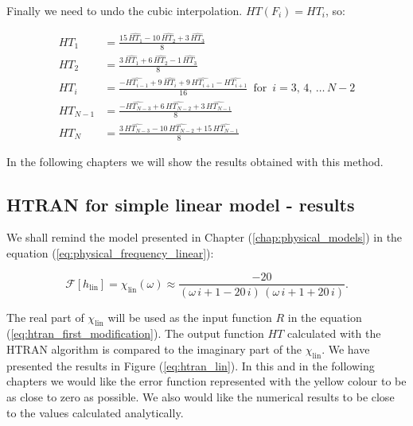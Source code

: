 \documentclass[12pt,twoside,a4paper]{article}
\numberwithin{equation}{subsection}
\numberwithin{figure}{subsection}
\begin{document}
Finally we need to undo the cubic interpolation. $ HT(F_i) = HT_{i} $, so: 

\begin{align}
  \label{eq:htundo_first}  
    HT_1       & = \frac {15 \, \widehat{HT_1} - 10 \, \widehat{HT_2} + 3 \, \widehat{HT_3}}{8}
    \\
  \label{eq:htundo_second}
    HT_2       & = \frac {3 \, \widehat{HT_1} + 6 \, \widehat{HT_2} - 1 \, \widehat{HT_3}}{8}
    \\ 
  \label{eq:htundo_next}
    HT_i       & = \frac { - \widehat{HT_{i - 1}} + 9 \, \widehat{HT_i} + 9 \, \widehat{HT_{i + 1}} - \widehat{ \mathit{HT}_{i + 1}} }
                   {16} \, \mbox{ for } \, i = 3, \, 4, \, \ldots \, {N - 2} 
    \\
  \label{eq:htundo_prelast}
    HT_{N - 1} & = \frac { - \widehat{HT_{N - 3}} + 6 \, \widehat{HT_{N - 2}} + 3 \, \widehat{HT_{N - 1}}}{8} 
    \\
  \label{eq:htundo_last}
    HT_N       & = \frac {3 \, \widehat{HT_{N - 3}} - 10 \, \widehat{HT_{N - 2}} + 15 \, \widehat{HT_{N - 1}}}{8}  
\end{align}

In the following chapters we will show the results obtained with this method.

\subsection{HTRAN for simple linear model - results} \label{chap:htran_lin}

We shall remind the model presented in Chapter (\ref{chap:physical_models}) in the equation (\ref{eq:physical_frequency_linear}):

\begin{equation} \label{eq:htran_remind_linmod}
  \mathcal{F}[h_{\text{lin}}] = \chi_{\text{lin}}(\omega) \approx \frac{ -20}{(\omega \,i + 1 -20\,i)\,(\omega \,i + 1 + 20\,i)} .
\end{equation}

The real part of $\chi_{\text{lin}}$ will be used as the input function $R$ in the equation (\ref{eq:htran_first_modification}). The output function $HT$ calculated with the HTRAN algorithm is compared to the imaginary part of the $\chi_{\text{lin}}$. We have presented the results in Figure (\ref{eq:htran_lin}). In this and in the following chapters we would like the error function represented with the yellow colour to be as close to zero as possible. We also would like the numerical results to be close to the values calculated analytically.
\end{document}
